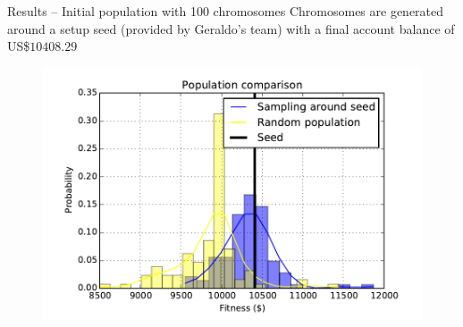 \documentclass[12pt,portuguese]{beamer}
\begin{document}

\begin{frame}{Results -- Initial population with 100 chromosomes}
	Chromosomes are generated around a setup seed (provided by Geraldo's team) with a final account balance of US\${$10408.29$}
	\begin{figure}[h]
	\centering
	\includegraphics[width=0.9\columnwidth]{images/01_100.pdf}
	\end{figure}
\end{frame}
\end{document}

